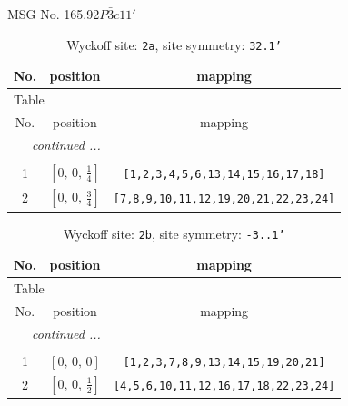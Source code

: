 \documentclass[fleqn,8pt]{jsarticle}
\begin{document}
\setcounter{MaxMatrixCols}{32}

\renewcommand{\tablename}{Table~}
\renewcommand{\figurename}{Figure~}
\begin{center}
\LARGE
MSG No. 165.92\quad$P\bar{3}c11'$
\end{center}
\renewcommand{\arraystretch}{1.2}
\begin{longtable}{ccc}
\caption{Wyckoff site: {\tt 2a}, site symmetry: {\tt 32.1'}}
 \\
 \hline \hline
No. & position & mapping \\ \hline \endfirsthead

\multicolumn{2}{l}{\tablename\ \thetable{}} \\
 \hline \hline
No. & position & mapping \\ \hline \endhead

 \hline \hline
\multicolumn{2}{r}{\footnotesize\it continued ...} \\ \endfoot

 \hline \hline
\multicolumn{2}{r}{} \\ \endlastfoot

1 & $\left[ 0,\, 0,\, \frac{1}{4} \right]$ & {\tt [1,2,3,4,5,6,13,14,15,16,17,18]} \\ \hline
2 & $\left[ 0,\, 0,\, \frac{3}{4} \right]$ & {\tt [7,8,9,10,11,12,19,20,21,22,23,24]} \\
\end{longtable}
\renewcommand{\arraystretch}{1.2}
\begin{longtable}{ccc}
\caption{Wyckoff site: {\tt 2b}, site symmetry: {\tt -3..1'}}
 \\
 \hline \hline
No. & position & mapping \\ \hline \endfirsthead

\multicolumn{2}{l}{\tablename\ \thetable{}} \\
 \hline \hline
No. & position & mapping \\ \hline \endhead

 \hline \hline
\multicolumn{2}{r}{\footnotesize\it continued ...} \\ \endfoot

 \hline \hline
\multicolumn{2}{r}{} \\ \endlastfoot

1 & $\left[ 0,\, 0,\, 0 \right]$ & {\tt [1,2,3,7,8,9,13,14,15,19,20,21]} \\ \hline
2 & $\left[ 0,\, 0,\, \frac{1}{2} \right]$ & {\tt [4,5,6,10,11,12,16,17,18,22,23,24]} \\
\end{longtable}
\end{document}
